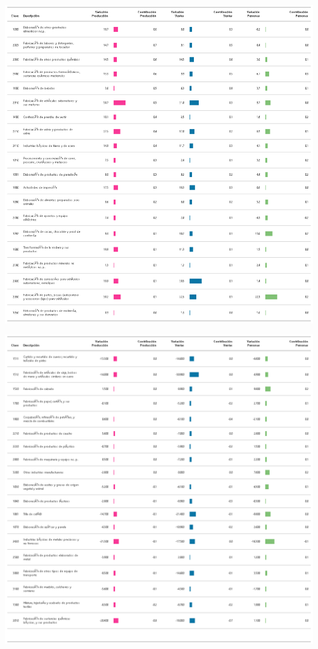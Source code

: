 \documentclass[
]{article}
\begin{document}
\begin{center}\includegraphics[width=14.78in]{tabla1_1} \end{center}

\begin{center}\includegraphics[width=14.78in]{tabla1_2} \end{center}
\end{document}
